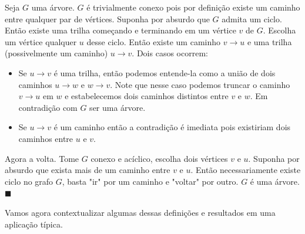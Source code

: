 \begin{prova}

Seja $G$ uma árvore. $G$ é trivialmente conexo pois por definição existe um caminho entre qualquer par de vértices. Suponha por absurdo que $G$ admita um ciclo. Então existe uma trilha começando e terminando em um vértice $v$ de $G$. Escolha um vértice qualquer $u$ desse ciclo. Então existe um caminho $v \to u $ e uma trilha (possivelmente um caminho) $u \to v$. Dois casos ocorrem:

\begin{itemize}
    \item Se $u \to v$ é uma trilha, então podemos entende-la como a união de dois caminhos $u \to w$ e $w \to v$. Note que nesse caso podemos truncar o caminho $v \to u$ em $w$ e estabelecemos dois caminhos distintos entre $v$ e $w$. Em contradição com $G$ ser uma árvore.

    \item Se $u \to v$ é um caminho então a contradição é imediata pois existiriam dois caminhos entre $u$ e $v$.
\end{itemize}


Agora a volta. Tome $G$ conexo e acíclico, escolha dois vértices $v$ e $u$. Suponha por absurdo que exista mais de um caminho entre $v$ e $u$. Então necessariamente existe ciclo no grafo $G$, basta "ir" por um caminho e "voltar" por outro. $G$ é uma árvore.
$\blacksquare$
\end{prova}




Vamos agora contextualizar algumas dessas definições e resultados em uma aplicação típica.

